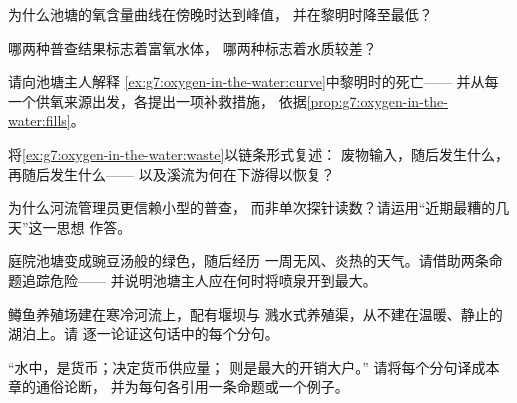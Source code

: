 \begin{exercise}[$\star$]\label{exo:g7:oxygen-in-the-water:5}
为什么池塘的氧含量曲线在傍晚时达到峰值，
并在黎明时降至最低？
\end{exercise}

\begin{exercise}[$\star$]\label{exo:g7:oxygen-in-the-water:6}
哪两种普查结果标志着富氧水体，
哪两种标志着水质较差？
\end{exercise}

\begin{exercise}[$\star\star$]\label{exo:g7:oxygen-in-the-water:7}
请向池塘主人解释
\cref{ex:g7:oxygen-in-the-water:curve}中黎明时的死亡——
并从每一个供氧来源出发，各提出一项补救措施，
依据\cref{prop:g7:oxygen-in-the-water:fills}。
\end{exercise}

\begin{exercise}[$\star\star$]\label{exo:g7:oxygen-in-the-water:8}
将\cref{ex:g7:oxygen-in-the-water:waste}以链条形式复述：
废物输入，随后发生什么，再随后发生什么——
以及溪流为何在下游得以恢复？
\end{exercise}

\begin{exercise}[$\star\star$]\label{exo:g7:oxygen-in-the-water:9}
为什么河流管理员更信赖小型的普查，
而非单次探针读数？请运用“近期最糟的几天”这一思想
作答。
\end{exercise}

\begin{exercise}[$\star\star$]\label{exo:g7:oxygen-in-the-water:10}
庭院池塘变成豌豆汤般的绿色，随后经历
一周无风、炎热的天气。请借助两条命题追踪危险——
并说明池塘主人应在何时将喷泉开到最大。
\end{exercise}

\begin{exercise}[$\star\star$]\label{exo:g7:oxygen-in-the-water:11}
鳟鱼养殖场建在寒冷河流上，配有堰坝与
溅水式养殖渠，从不建在温暖、静止的湖泊上。请
逐一论证这句话中的每个分句。
\end{exercise}

\begin{exercise}[$\star\star\star$]\label{exo:g7:oxygen-in-the-water:12}
“水中，是货币；决定货币供应量；
则是最大的开销大户。”
请将每个分句译成本章的通俗论断，
并为每句各引用一条命题或一个例子。
\end{exercise}

